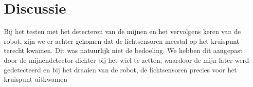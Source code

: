 \documentclass{report}
\begin{document}
\section{Discussie}
Bij het testen met het detecteren van de mijnen en het vervolgens keren van de robot, zijn we er achter gekomen dat de lichtsensoren meestal op het kruispunt terecht kwamen. Dit was natuurlijk niet de bedoeling. We hebben dit aangepast door de mijnendetector dichter bij het wiel te zetten, waardoor de mijn later werd gedetecteerd en bij het draaien van de robot, de lichtsensoren precies voor het kruispunt uitkwamen
\end{document}
